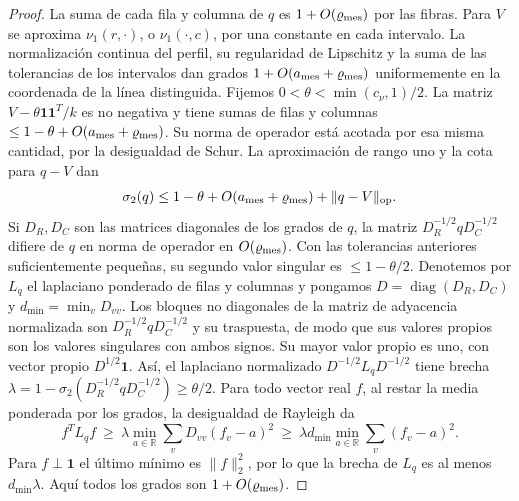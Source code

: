 \begin{proof}
La suma de cada fila y columna de $q$ es $1+O(\varrho_{\rm mes})$ por las fibras. Para $V$ se aproxima
$\nu_1(r,\cdot)$, o $\nu_1(\cdot,c)$, por una constante en cada intervalo. La normalización continua
del perfil, su regularidad de Lipschitz y la suma de las tolerancias de los intervalos dan grados
$1+O(a_{\rm mes}+\varrho_{\rm mes})$ uniformemente en la coordenada de la línea distinguida. Fijemos
${0<\theta<\min(c_\nu,1)/2}$.
La matriz $V-\theta\mathbf1\mathbf1^T/k$ es no negativa y tiene sumas de filas y columnas
${\le1-\theta+O(a_{\rm mes}+\varrho_{\rm mes})}$. Su norma de operador está acotada por esa misma
cantidad, por la
desigualdad de
Schur. La aproximación de rango uno y la cota para $q-V$ dan
\[
 \sigma_2(q)\le1-\theta+O(a_{\rm mes}+\varrho_{\rm mes})+\|q-V\|_{\rm op}.
\]
Si $D_R,D_C$ son las
matrices diagonales de
los grados de $q$, la matriz $D_R^{-1/2}qD_C^{-1/2}$ difiere de $q$ en norma de operador en
$O(\varrho_{\rm mes})$. Con las tolerancias anteriores suficientemente pequeñas, su segundo valor
singular es $\le1-\theta/2$. Denotemos por $L_q$ el laplaciano ponderado de filas y columnas y
pongamos $D=\operatorname{diag}(D_R,D_C)$ y $d_{\min}=\min_v D_{vv}$. Los bloques no diagonales de
la matriz de adyacencia normalizada son $D_R^{-1/2}qD_C^{-1/2}$ y su traspuesta, de modo que sus
valores propios son los valores singulares con ambos signos. Su mayor valor propio es uno, con vector
propio $D^{1/2}\mathbf1$. Así, el laplaciano normalizado $D^{-1/2}L_qD^{-1/2}$ tiene brecha
$\lambda=1-\sigma_2(D_R^{-1/2}qD_C^{-1/2})\ge\theta/2$. Para todo vector real $f$, al restar la
media ponderada por los grados, la desigualdad de Rayleigh da
\[
 f^TL_q f\ \ge\ \lambda\min_{a\in\mathbb R}\sum_v D_{vv}(f_v-a)^2
 \ \ge\ \lambda d_{\min}\min_{a\in\mathbb R}\sum_v(f_v-a)^2 .
\]
Para $f\perp\mathbf1$ el último mínimo es $\|f\|_2^2$, por lo que
la brecha de $L_q$ es al menos $d_{\min}\lambda$. Aquí todos los grados son $1+O(\varrho_{\rm mes})$.


\end{proof}

